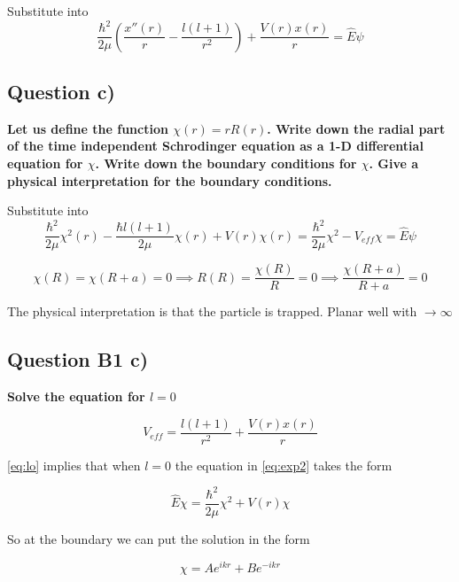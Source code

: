 \documentclass[12pt]{article}
\begin{document}
Substitute into 
\begin{equation}
\label{eq:exp}
\frac{\hbar^{2}}{2 \mu} \left(\frac{x''(r)}{r}-\frac{l(l+1)}{r^{2}}\right)+\frac{V(r)x(r)}{r}=\hat{E}\psi
\end{equation}
\clearpage
\subsection*{Question c)} 
\textbf{Let us define the function $\chi(r)=rR(r)$. Write down the radial part of the time independent Schrodinger equation as a 1-D differential equation for $\chi$.
Write down the boundary conditions for $\chi$. Give a physical interpretation for the boundary conditions.}

Substitute into 
\begin{equation}
\label{eq:exp2}
\frac{\hbar^{2}}{2 \mu}\chi^{2}(r)-\frac{\hbar l(l+1)}{2\mu}\chi(r)+V(r)\chi(r)=\frac{\hbar^{2}}{2 \mu}\chi^{2}-V_{eff}\chi=\hat{E}\psi
\end{equation}


\begin{equation}
\label{eq:}
\chi{(R)}=\chi{(R+a)}=0\implies R(R)=\frac{\chi(R)}{R}=0\implies \frac{\chi(R+a)}{R+a}=0
\end{equation}

The physical interpretation is that the particle is trapped. Planar well with $ \to \infty$

\subsection*{Question B1 c)}
\textbf{Solve the equation for $l=0$}

\begin{equation}
\label{eq:lo}
V_{eff}=\frac{l(l+1)}{r^{2}}+\frac{V(r)x(r)}{r}
\end{equation}

\noindent
\cref{eq:lo} implies that when $l=0$ the equation in \cref{eq:exp2} takes the form

\begin{equation}
\label{eq:exp3}
\hat{E}\chi=\frac{\hbar^{2}}{2 \mu}\chi^{2}+V(r)\chi
\end{equation}

\noindent
So at the boundary we can put the solution in the form 

\begin{equation}
\label{eq:soll1}
\chi=Ae^{ikr}+Be^{-ikr}
\end{equation}
\end{document}
